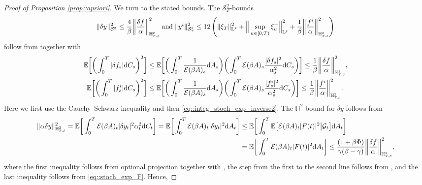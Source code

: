 \documentclass[10pt]{article} %
\newcommand\cE{\mathcal E}
\newcommand\cG{\mathcal G}
\newcommand\cS{\mathcal S}
\newcommand{\smalltext}[1]{\text{\fontsize{4}{4}\selectfont$#1$}}
\def \E{\mathbb{E}}
\def \H{\mathbb{H}}
\def \L{\mathbb{L}}
\newcommand{\1}{\mathbf{1}}
\def\d{\mathrm{d}}
\begin{document}
\begin{proof}[Proof of Proposition \ref{prop::apriori}]
\medskip
We turn to the stated bounds. The $\cS^2_T$-bounds
\begin{equation}\label{eq::S2T_bounds_proof}
	\|\delta y\|^2_{\cS^\smalltext{2}_\smalltext{T}} \leq \frac{4}{\beta} \bigg\| \frac{\delta f}{\alpha} \bigg\|^2_{\H^{\smalltext{2}}_{\smalltext{T}\smalltext{,}\smalltext{\beta}}} \; \text{and} \; \|y^i\|^2_{\cS^\smalltext{2}_\smalltext{T}} \leq 12 \, \Bigg(\|\xi_T\|^2_{\L^\smalltext{2}} + \Big\|\sup_{u \in [0,T)} \xi^+_u\Big\|^2_{\L^\smalltext{2}} +  \frac{1}{\beta}\bigg\|\frac{f^i}{\alpha}\bigg\|^2_{\H^\smalltext{2}_{\smalltext{T}\smalltext{,}\smalltext{\beta}}}\Bigg)
\end{equation}
follow from  together with
\begin{align}
	\E\bigg[\bigg(\int_0^T |\delta f_s| \d C_s \bigg)^2\bigg] &\leq \E\bigg[\bigg(\int_0^T \frac{1}{\cE(\beta A)_s}\d A_s\bigg)\bigg(\int_0^T \cE(\beta A)_s\frac{|\delta f_s|^2}{\alpha^2_s} \d C_s \bigg)\bigg] \leq \frac{1}{\beta} \bigg\|\frac{\delta f}{\alpha}\bigg\|^2_{\H^\smalltext{2}_{\smalltext{T}\smalltext{,}\smalltext{\beta}}},\label{eq::bound_integral_delta_f}\\
	\E\bigg[\bigg(\int_0^T |f^i_s| \d C_s \bigg)^2\bigg] &\leq \E\bigg[\bigg(\int_0^T \frac{1}{\cE(\beta A)_s}\d A_s\bigg)\bigg(\int_0^T \cE(\beta A)_s\frac{|f^i_s|^2}{\alpha^2_s} \d C_s \bigg)\bigg] \leq \frac{1}{\beta} \bigg\|\frac{f^i}{\alpha}\bigg\|^2_{\H^\smalltext{2}_{\smalltext{T}\smalltext{,}\smalltext{\beta}}}. \label{eq::bound_integral_f}
\end{align}
Here we first use the Cauchy--Schwarz inequality and then \eqref{eq::integ_stoch_exp_inverse2}.
The $\H^2$-bound for $\delta y$ follows from
\begin{align*}
	\|\alpha \delta y\|^2_{\H^2_{\smalltext{T}\smalltext{,}\smalltext{\beta}}} = \E \bigg[ \int_0^T \cE(\beta A)_t |\delta y_t|^2 \alpha^2_t \d C_t \bigg] 
	= \E \bigg[ \int_0^T \cE(\beta A)_t |\delta y_{t}|^2 \d A_t \bigg] 
&\leq \E \bigg[ \int_0^T \E \big[ \cE(\beta A)_t |F(t)|^2 \big| \cG_{t} \big] \d A_t \bigg] \\
	&= \E \bigg[ \int_0^T \cE(\beta A)_t |F(t)|^2 \d A_t \bigg]
	\leq \frac{(1+\beta\Phi)}{\gamma(\beta - \gamma)} \bigg\| \frac{\delta f}{\alpha} \bigg\|^2_{\H^{\smalltext{2}}_{\smalltext{T}\smalltext{,}\smalltext{\beta}}},
\end{align*}
where the first inequality follows from optional projection together with , the step from the first to the second line follows from \cite[Theorem VI.57]{dellacherie1982probabilities}, and the last inequality follows from \eqref{eq::stoch_exp_F}. Hence,

\end{proof}
\end{document}
